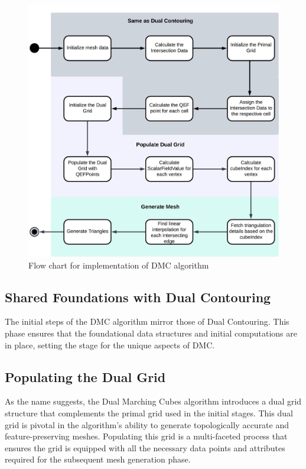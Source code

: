 \begin{figure}[ht!]
\centering
\includegraphics[width=1.0\textwidth]{Figures/DMC-FlowChart.jpeg}
\decoRule
\caption{Flow chart for implementation of DMC algorithm}
\label{fig:dmc-flow-chart}
\end{figure}

\subsection{Shared Foundations with Dual Contouring}

The initial steps of the DMC algorithm mirror those of Dual Contouring. This phase ensures that the foundational data structures and initial computations are in place, setting the stage for the unique aspects of DMC.


\subsection{Populating the Dual Grid} \label{populating-dual-grid}

As the name suggests, the Dual Marching Cubes algorithm introduces a dual grid structure that complements the primal grid used in the initial stages. This dual grid is pivotal in the algorithm's ability to generate topologically accurate and feature-preserving meshes. Populating this grid is a multi-faceted process that ensures the grid is equipped with all the necessary data points and attributes required for the subsequent mesh generation phase.

